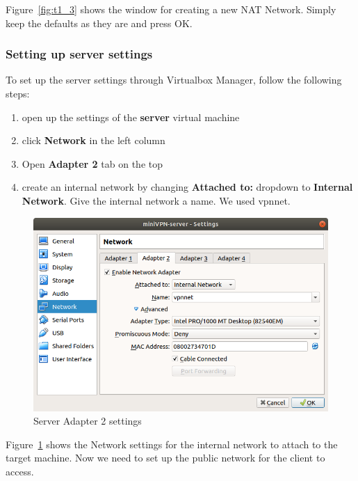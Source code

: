 \documentclass[12pt]{article}
\begin{document}
    Figure~\ref{fig:t1_3} shows the window for creating a new NAT Network. Simply keep the defaults as they are and press OK.

\subsubsection{Setting up server settings}
    To set up the server settings through Virtualbox Manager, follow the following steps:
    \begin{enumerate}
        \item open up the settings of the \textbf{server} virtual machine
        \item click \textbf{Network} in the left column
        \item Open \textbf{Adapter 2} tab on the top
        \item create an internal network by changing \textbf{Attached to:} dropdown to \textbf{Internal Network}. Give the internal network a name. We used vpnnet.
    \end{enumerate}
    
    \begin{figure}[H]
        \begin{center}
            \includegraphics[scale=0.5]{networking_server.png}
        \end{center}{}
        \caption{Server Adapter 2 settings}
        \label{fig:networking_server}
    \end{figure}
    
    Figure~\ref{fig:networking_server} shows the Network settings for the internal network to attach to the target machine. Now we need to set up the public network for the client to access.
    
\end{document}
